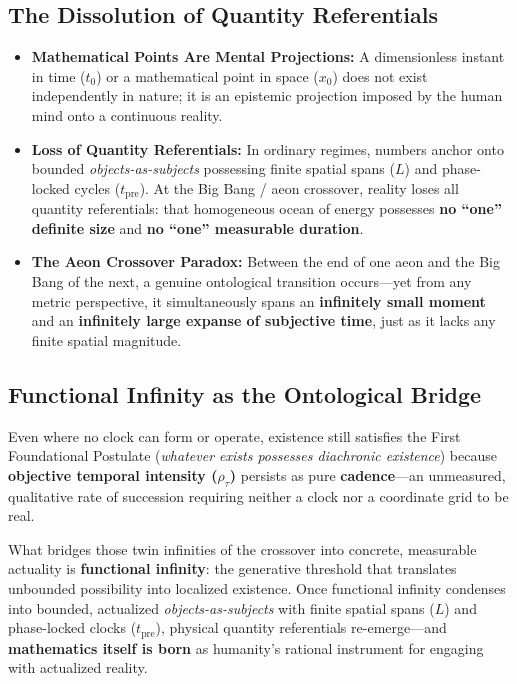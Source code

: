 \documentclass[11pt,a4paper]{article}
\begin{document}
\subsection{The Dissolution of Quantity Referentials}
\begin{itemize}
    \item \textbf{Mathematical Points Are Mental Projections:} A dimensionless instant in time ($t_0$) or a mathematical point in space ($x_0$) does not exist independently in nature; it is an epistemic projection imposed by the human mind onto a continuous reality.
    \item \textbf{Loss of Quantity Referentials:} In ordinary regimes, numbers anchor onto bounded \emph{objects-as-subjects} possessing finite spatial spans ($L$) and phase-locked cycles ($t_{\mathrm{pre}}$). At the Big Bang / aeon crossover, reality loses all quantity referentials: that homogeneous ocean of energy possesses \textbf{no ``one'' definite size} and \textbf{no ``one'' measurable duration}.
    \item \textbf{The Aeon Crossover Paradox:} Between the end of one aeon and the Big Bang of the next, a genuine ontological transition occurs---yet from any metric perspective, it simultaneously spans an \textbf{infinitely small moment} and an \textbf{infinitely large expanse of subjective time}, just as it lacks any finite spatial magnitude.
\end{itemize}

\subsection{Functional Infinity as the Ontological Bridge}
Even where no clock can form or operate, existence still satisfies the First Foundational Postulate (\emph{whatever exists possesses diachronic existence}) because \textbf{objective temporal intensity ($\rho_\tau$)} persists as pure \textbf{cadence}---an unmeasured, qualitative rate of succession requiring neither a clock nor a coordinate grid to be real.

What bridges those twin infinities of the crossover into concrete, measurable actuality is \textbf{functional infinity}: the generative threshold that translates unbounded possibility into localized existence. Once functional infinity condenses into bounded, actualized \emph{objects-as-subjects} with finite spatial spans ($L$) and phase-locked clocks ($t_{\mathrm{pre}}$), physical quantity referentials re-emerge---and \textbf{mathematics itself is born} as humanity's rational instrument for engaging with actualized reality.
\end{document}
